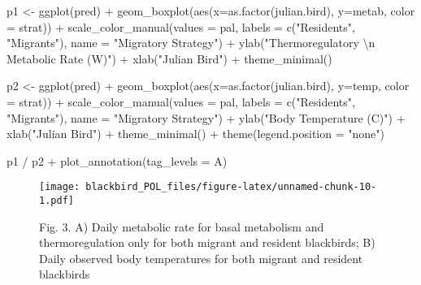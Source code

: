 \documentclass[
]{article}
\newenvironment{Shaded}{\begin{snugshade}}{\end{snugshade}}
\newcommand{\AttributeTok}[1]{\textcolor[rgb]{0.77,0.63,0.00}{#1}}
\newcommand{\FunctionTok}[1]{\textcolor[rgb]{0.00,0.00,0.00}{#1}}
\newcommand{\NormalTok}[1]{#1}
\newcommand{\OtherTok}[1]{\textcolor[rgb]{0.56,0.35,0.01}{#1}}
\newcommand{\SpecialCharTok}[1]{\textcolor[rgb]{0.00,0.00,0.00}{#1}}
\newcommand{\StringTok}[1]{\textcolor[rgb]{0.31,0.60,0.02}{#1}}
\begin{document}
\begin{Shaded}
\begin{Highlighting}[]
\NormalTok{p1 }\OtherTok{\textless{}{-}} \FunctionTok{ggplot}\NormalTok{(pred) }\SpecialCharTok{+} 
  \FunctionTok{geom\_boxplot}\NormalTok{(}\FunctionTok{aes}\NormalTok{(}\AttributeTok{x=}\FunctionTok{as.factor}\NormalTok{(julian.bird), }\AttributeTok{y=}\NormalTok{metab, }\AttributeTok{color =}\NormalTok{ strat)) }\SpecialCharTok{+}
  \FunctionTok{scale\_color\_manual}\NormalTok{(}\AttributeTok{values =}\NormalTok{ pal, }\AttributeTok{labels =} \FunctionTok{c}\NormalTok{(}\StringTok{"Residents"}\NormalTok{, }\StringTok{"Migrants"}\NormalTok{),}
                     \AttributeTok{name =} \StringTok{"Migratory Strategy"}\NormalTok{) }\SpecialCharTok{+}
  \FunctionTok{ylab}\NormalTok{(}\StringTok{"Thermoregulatory }\SpecialCharTok{\textbackslash{}n}\StringTok{ Metabolic Rate (W)"}\NormalTok{) }\SpecialCharTok{+}
  \FunctionTok{xlab}\NormalTok{(}\StringTok{"Julian Bird"}\NormalTok{) }\SpecialCharTok{+}
  \FunctionTok{theme\_minimal}\NormalTok{()}

\NormalTok{p2 }\OtherTok{\textless{}{-}} \FunctionTok{ggplot}\NormalTok{(pred) }\SpecialCharTok{+} 
  \FunctionTok{geom\_boxplot}\NormalTok{(}\FunctionTok{aes}\NormalTok{(}\AttributeTok{x=}\FunctionTok{as.factor}\NormalTok{(julian.bird), }\AttributeTok{y=}\NormalTok{temp, }\AttributeTok{color =}\NormalTok{ strat)) }\SpecialCharTok{+}
  \FunctionTok{scale\_color\_manual}\NormalTok{(}\AttributeTok{values =}\NormalTok{ pal, }\AttributeTok{labels =} \FunctionTok{c}\NormalTok{(}\StringTok{"Residents"}\NormalTok{, }\StringTok{"Migrants"}\NormalTok{),}
                     \AttributeTok{name =} \StringTok{"Migratory Strategy"}\NormalTok{) }\SpecialCharTok{+}
  \FunctionTok{ylab}\NormalTok{(}\StringTok{"Body Temperature (C)"}\NormalTok{) }\SpecialCharTok{+}
  \FunctionTok{xlab}\NormalTok{(}\StringTok{"Julian Bird"}\NormalTok{) }\SpecialCharTok{+}
  \FunctionTok{theme\_minimal}\NormalTok{() }\SpecialCharTok{+}
  \FunctionTok{theme}\NormalTok{(}\AttributeTok{legend.position =} \StringTok{"none"}\NormalTok{)}

\NormalTok{p1 }\SpecialCharTok{/}\NormalTok{ p2 }\SpecialCharTok{+} \FunctionTok{plot\_annotation}\NormalTok{(}\AttributeTok{tag\_levels =} \StringTok{\textquotesingle{}A\textquotesingle{}}\NormalTok{)}
\end{Highlighting}
\end{Shaded}

\begin{figure}
\centering
\texttt{[image: blackbird\_POL\_files/figure-latex/unnamed-chunk-10-1.pdf]}
\caption{Fig. 3. A) Daily metabolic rate for basal metabolism and
thermoregulation only for both migrant and resident blackbirds; B) Daily
observed body temperatures for both migrant and resident blackbirds}
\end{figure}
\end{document}
